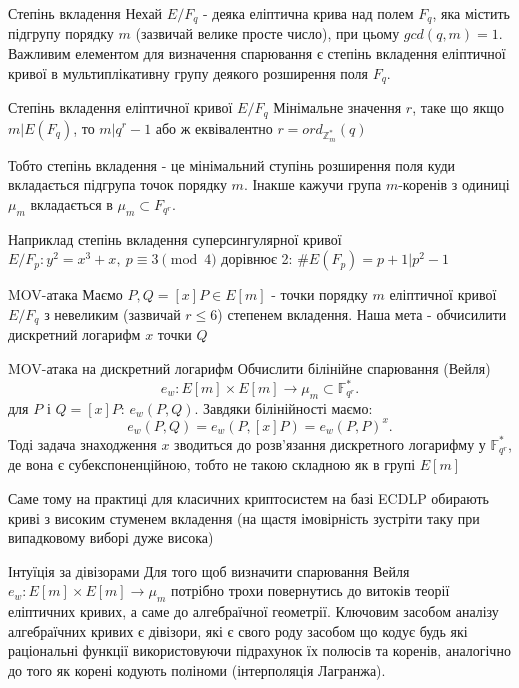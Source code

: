 \documentclass[9pt]{beamer}
\begin{document}
\begin{darkframes}
\begin{frame}{Степінь вкладення}
Нехай $E/F_q$ - деяка еліптична крива над полем $F_q$, яка містить підгрупу порядку $m$ (зазвичай велике просте число), при цьому $gcd(q,m) = 1$. Важливим елементом для визначення спарювання є степінь вкладення еліптичної кривої в мультиплікативну групу деякого розширення поля $F_q$.
    \begin{block}{Степінь вкладення еліптичної кривої $E/F_q$}
        Мінімальне значення $r$, таке що якщо $m | E(F_q)$, то $ m \vert q^r-1$ або ж еквівалентно $r=ord_{\mathbb{Z}_m^*}(q)$
    \end{block}
    Тобто степінь вкладення - це мінімальний ступінь розширення поля куди вкладається підгрупа точок порядку $m$. Інакше кажучи група $m$-коренів з одиниці $\mu_m$ вкладається в $\mu_m \subset F_{q^r}$.
    
    Наприклад степінь вкладення суперсингулярної кривої $E/F_p:y^2=x^3+x,\ p \equiv 3 \pmod 4$ дорівнює 2: $\#E(F_p)=p+1 \vert p^2 -1 $
\end{frame}

\begin{frame}{MOV-атака}
  Маємо $P,Q=[x]P \in E[m]$ - точки порядку $m$ еліптичної кривої $E/F_q$ з невеликим (зазвичай $r\le6$) степенем вкладення. Наша мета - обчисилити дискретний логарифм $x$ точки $Q$
  \begin{block}{MOV-атака на дискретний логарифм}
    Обчислити білінійне спарювання (Вейля)
      \[
      e_w : E[m] \times E[m] \to \mu_m \subset \mathbb{F}_{q^r}^*.
      \]
      для \(P\) і \(Q = [x]P\): \(e_w(P, Q)\). Завдяки білінійності маємо:
      \[
      e_w(P, Q) = e_w(P, [x]P) = e_w(P,P)^x.
      \]
      Тоді задача знаходження \(x\) зводиться до розв’язання дискретного логарифму у \(\mathbb{F}_{q^r}^*\), де вона є субекспоненційною, тобто не такою складною як в групі $E[m]$
  \end{block}
  Саме тому на практиці для класичних криптосистем на базі ECDLP обирають криві з високим стуменем вкладення (на щастя імовірність зустріти таку при випадковому виборі дуже висока)
\end{frame}

\begin{frame}{Інтуїція за дівізорами}
    Для того щоб визначити спарювання Вейля $e_w:E[m]\times E[m] \to \mu_m$ потрібно трохи повернутись до витоків теорії еліптичних кривих, а саме до алгебраїчної геометрії. Ключовим засобом аналізу алгебраїчних кривих є дівізори, які є свого роду засобом що кодує будь які раціональні функції використовуючи підрахунок їх полюсів та коренів, аналогічно до того як корені кодують поліноми (інтерполяція Лагранжа).


\end{frame}
\end{darkframes}
\end{document}
